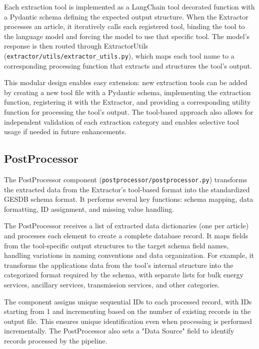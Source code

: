 \documentclass[11pt]{article}
\begin{document}
Each extraction tool is implemented as a LangChain tool decorated function with a Pydantic schema defining the expected output structure. When the Extractor processes an article, it iteratively calls each registered tool, binding the tool to the language model and forcing the model to use that specific tool. The model's response is then routed through ExtractorUtils (\texttt{extractor/utils/extractor\_utils.py}), which maps each tool name to a corresponding processing function that extracts and structures the tool's output.

This modular design enables easy extension: new extraction tools can be added by creating a new tool file with a Pydantic schema, implementing the extraction function, registering it with the Extractor, and providing a corresponding utility function for processing the tool's output. The tool-based approach also allows for independent validation of each extraction category and enables selective tool usage if needed in future enhancements.

\subsection{PostProcessor}

The PostProcessor component (\texttt{postprocessor/postprocessor.py}) transforms the extracted data from the Extractor's tool-based format into the standardized GESDB schema format. It performs several key functions: schema mapping, data formatting, ID assignment, and missing value handling.

The PostProcessor receives a list of extracted data dictionaries (one per article) and processes each element to create a complete database record. It maps fields from the tool-specific output structures to the target schema field names, handling variations in naming conventions and data organization. For example, it transforms the applications data from the tool's internal structure into the categorized format required by the schema, with separate lists for bulk energy services, ancillary services, transmission services, and other categories.

The component assigns unique sequential IDs to each processed record, with IDs starting from 1 and incrementing based on the number of existing records in the output file. This ensures unique identification even when processing is performed incrementally. The PostProcessor also sets a "Data Source" field to identify records processed by the pipeline.
\end{document}
